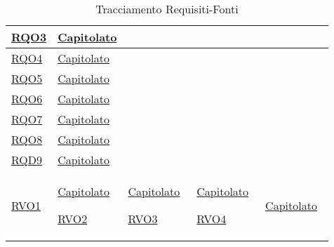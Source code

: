 \begin{longtable}{|>{\centering}m{5cm}|m{5cm}<{\centering}|}
 \hyperlink{RQO3}{RQO3} & \hyperlink{Capitolato}{Capitolato}\\
\hline

 \hyperlink{RQO4}{RQO4} & \hyperlink{Capitolato}{Capitolato}\\
\hline

 \hyperlink{RQO5}{RQO5} & \hyperlink{Capitolato}{Capitolato}\\
\hline

 \hyperlink{RQO6}{RQO6} & \hyperlink{Capitolato}{Capitolato}\\
\hline

 \hyperlink{RQO7}{RQO7} & \hyperlink{Capitolato}{Capitolato}\\
\hline

 \hyperlink{RQO8}{RQO8} & \hyperlink{Capitolato}{Capitolato}\\
\hline

 \hyperlink{RQD9}{RQD9} & \hyperlink{Capitolato}{Capitolato}\\
\hline

 \hyperlink{RVO1}{RVO1} & \hyperlink{Capitolato}{Capitolato}\
\hline

 \hyperlink{RVO2}{RVO2} & \hyperlink{Capitolato}{Capitolato}\
\hline

 \hyperlink{RVO3}{RVO3} & \hyperlink{Capitolato}{Capitolato}\
\hline

 \hyperlink{RVO4}{RVO4} & \hyperlink{Capitolato}{Capitolato}\
\hline

\caption[Tracciamento Requisiti-Fonti]{Tracciamento Requisiti-Fonti}
\label{tabella:requi-fonti}
\end{longtable}
\clearpage

